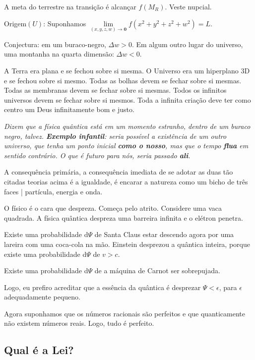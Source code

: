 \documentclass[12pt,a4paper]{article}
\begin{document}
			A meta do terrestre na transi\c{c}\~ao \'e alcan\c{c}ar $f(M_R)$. Veste nupcial\cite{batista}.

			Origem$(U)$: Suponhamos $\underset{(x,y,z,w) \rightarrow \mathbf{0}}{\operatorname{\lim}} f(x^2 + y^2 + z^2 + w^2) = L.$

			Conjectura: em um buraco-negro, $\Delta w > 0$. Em algum outro lugar do universo, uma montanha na quarta dimens\~ao: $\Delta w < 0$.

			A Terra era plana e se fechou sobre si mesma. O Universo era um hiperplano 3D e se fechou sobre si mesmo. Todas as bolhas devem se fechar sobre si mesmas. Todas as membranas devem se fechar sobre si mesmas. Todos os infinitos universos devem se fechar sobre si mesmos. Toda a infinita cria\c{c}\~ao deve ter como centro um Deus infinitamente bom e justo.

			\emph{Dizem que a f\'isica qu\^antica est\'a em um momento estranho, dentro de um buraco negro, talvez. \textbf{Exemplo infantil}: seria poss\'ivel a exist\^encia de um outro universo, que tenha um ponto inicial \textbf{como o nosso}, mas que o tempo\cite{tempo} \textbf{flua} em sentido contr\'ario. O que \'e futuro para n\'os, seria passado \textbf{ali}.}

A consequ\^encia prim\'aria, a consequ\^encia imediata de se
adotar as duas t\~ao citadas teorias acima \'e a igualdade, \'e encarar a
natureza como um bicho de tr\^es faces | part\'icula, energia e onda.

O f\'isico \'e o cara que despreza. Come\c{c}a pelo atrito. Considere uma vaca
quadrada. A f\'isica qu\^antica despreza uma barreira infinita e o el\'etron
penetra.

Existe uma probabilidade d$\Psi$ de
Santa Claus estar descendo agora por uma lareira com uma coca-cola na
m\~ao.
Einstein desprezou a qu\^antica inteira, porque existe uma probabilidade d$\Psi$ de $v > c$.

Existe uma probabilidade d$\Psi$ de a
 m\'aquina de Carnot ser sobrepujada.

Logo, eu prefiro acreditar que a ess\^encia da qu\^antica \'e desprezar $\Psi < \epsilon$, para $\epsilon$ adequadamente pequeno.

Agora suponhamos que os n\'umeros racionais s\~ao perfeitos e que
quanticamente n\~ao existem n\'umeros reais. Logo, tudo \'e perfeito.

		\subsection{Qual \'e a Lei?}\label{leiPerfeicao}
			\begin{flushright}
			\end{flushright}
\end{document}
